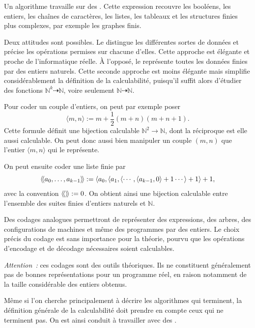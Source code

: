 \thingy Un algorithme travaille sur des .  Cette
expression recouvre les booléens, les entiers, les chaînes de
caractères, les listes, les tableaux et les structures finies plus
complexes, par exemple les graphes finis.

Deux attitudes sont possibles.  Le  distingue les
différentes sortes de données et précise les opérations permises sur
chacune d'elles.  Cette approche est élégante et proche de
l'informatique réelle.  À l'opposé, le  représente toutes les données finies par
des entiers naturels.  Cette seconde approche est moins élégante mais
simplifie considérablement la définition de la calculabilité, puisqu'il
suffit alors d'étudier des fonctions
$\mathbb{N}^k\dasharrow\mathbb{N}$, voire seulement
$\mathbb{N}\dasharrow\mathbb{N}$.

\thingy\label{godel-coding} Pour coder un couple d'entiers, on peut par
exemple poser
\[
\langle m,n\rangle
 := m+\frac{1}{2}(m+n)(m+n+1).
\]
Cette formule définit une bijection calculable
$\mathbb{N}^2\to\mathbb{N}$, dont la réciproque est elle aussi
calculable.  On peut donc aussi bien manipuler un couple $(m,n)$ que
l'entier $\langle m,n\rangle$ qui le représente.

On peut ensuite coder une liste finie par
\[
\mathopen{\langle\!\langle} a_0,\ldots,a_{k-1}\mathclose{\rangle\!\rangle}
 := \langle a_0,
       \langle a_1,
       \langle\cdots,
       \langle a_{k-1},0\rangle+1
       \cdots\rangle+1\rangle+1,
\]
avec la convention $\mathopen{\langle\!\langle}\mathclose{\rangle\!\rangle}:=0$.  On obtient ainsi une
bijection calculable entre l'ensemble des suites finies d'entiers
naturels et $\mathbb{N}$.

Des codages analogues permettront de représenter des expressions, des
arbres, des configurations de machines et même des programmes par des
entiers.  Le choix précis du codage est sans importance pour la théorie,
pourvu que les opérations d'encodage et de décodage nécessaires soient
calculables.

{\footnotesize
\thingy \emph{Attention :} ces codages sont des outils théoriques.  Ils
ne constituent généralement pas de bonnes représentations pour un
programme réel, en raison notamment de la taille considérable des
entiers obtenus.
\par}

\thingy Même si l'on cherche principalement à décrire les algorithmes
qui terminent, la définition générale de la calculabilité doit prendre
en compte ceux qui ne terminent pas.  On est ainsi conduit à travailler
avec des .

